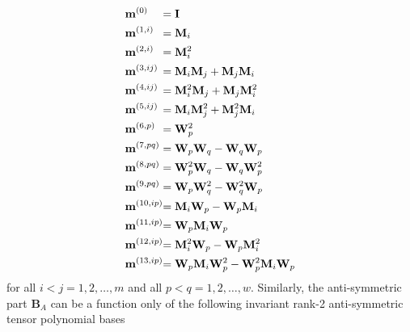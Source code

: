 \begin{subequations}
\label{E:28}
\begin{align}
	\mathmakebox[\widthof{$\mathbf{m}^{(8,pq)}$}][l]{\mathbf{m}^{(0)}}
 	&= \mathbf{I}  \\
	\mathmakebox[\widthof{$\mathbf{m}^{(8,pq)}$}][l]{\mathbf{m}^{(1,i)}}
	&= \mathbf{M}_i \\ 
	\mathmakebox[\widthof{$\mathbf{m}^{(8,pq)}$}][l]{\mathbf{m}^{(2,i)}}
	&= \mathbf{M}^2_i \\
	\mathmakebox[\widthof{$\mathbf{m}^{(8,pq)}$}][l]{\mathbf{m}^{(3,ij)}}
	&= \mathbf{M}_i \mathbf{M}_j + \mathbf{M}_j \mathbf{M}_i \\
	\mathmakebox[\widthof{$\mathbf{m}^{(8,pq)}$}][l]{\mathbf{m}^{(4,ij)}}
	&= \mathbf{M}^2_i \mathbf{M}_j + \mathbf{M}_j \mathbf{M}^2_i \\
	\mathmakebox[\widthof{$\mathbf{m}^{(8,pq)}$}][l]{\mathbf{m}^{(5,ij)}}
	&= \mathbf{M}_i \mathbf{M}^2_j + \mathbf{M}^2_j \mathbf{M}_i \\
	\mathmakebox[\widthof{$\mathbf{m}^{(8,pq)}$}][l]{\mathbf{m}^{(6,p)}}
	&= \mathbf{W}^2_p \\ 
	\mathmakebox[\widthof{$\mathbf{m}^{(8,pq)}$}][l]{\mathbf{m}^{(7,pq)}}
	&= \mathbf{W}_p \mathbf{W}_q - \mathbf{W}_q \mathbf{W}_p \\ 
	\mathmakebox[\widthof{$\mathbf{m}^{(8,pq)}$}][l]{\mathbf{m}^{(8,pq)}}
	&= \mathbf{W}^2_p \mathbf{W}_q - \mathbf{W}_q \mathbf{W}^2_p \\
	\mathmakebox[\widthof{$\mathbf{m}^{(8,pq)}$}][l]{\mathbf{m}^{(9,pq)}}
	&= \mathbf{W}_p \mathbf{W}^2_q - \mathbf{W}^2_q \mathbf{W}_p \\
	\mathmakebox[\widthof{$\mathbf{m}^{(8,pq)}$}][l]{\mathbf{m}^{(10,ip)}}
	&= \mathbf{M}_i \mathbf{W}_p - \mathbf{W}_p \mathbf{M}_i   \\
	\mathmakebox[\widthof{$\mathbf{m}^{(8,pq)}$}][l]{\mathbf{m}^{(11,ip)}}
	&= \mathbf{W}_p \mathbf{M}_i \mathbf{W}_p   \\ 
	\mathmakebox[\widthof{$\mathbf{m}^{(8,pq)}$}][l]{\mathbf{m}^{(12,ip)}}
	&= \mathbf{M}^2_i \mathbf{W}_p-\mathbf{W}_p \mathbf{M}^2_i\\ 
	\mathmakebox[\widthof{$\mathbf{m}^{(8,pq)}$}][l]{\mathbf{m}^{(13,ip)}}
	&= \mathbf{W}_p \mathbf{M}_i \mathbf{W}^2_p
	  -\mathbf{W}^2_p \mathbf{M}_i \mathbf{W}_p
\end{align}
\end{subequations}
%
%      	
for all $i<j = 1,2,\ldots,m$  and all $p<q = 1,2,\ldots,w$.  Similarly, the anti-symmetric part  $\mathbf{B}_A$ can be a function only of the following invariant rank-2 anti-symmetric tensor polynomial bases
